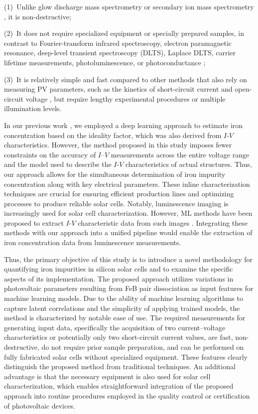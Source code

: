 \documentclass[a4paper,fleqn]{cas-sc}
\begin{document}
\noindent
(1)~Unlike glow discharge mass spectrometry or secondary ion mass spectrometry \cite{DiSabatino2014}, it is non-destructive;

\noindent
(2)~It does not require specialized equipment or specially prepared samples, in contrast
to Fourier-transform infrared spectroscopy, electron paramagnetic resonance, deep-level transient spectroscopy (DLTS),
Laplace DLTS, carrier lifetime measurements, photoluminescence, or photoconductance
\cite{Schroder2006, HowMuchPhysics, LaplDLTS, Rein2, Schmidt2005, FeMethod2012, Goodarzi2017};

\noindent
(3)~It is relatively simple and fast compared to other methods that also rely on measuring PV parameters,
such as the kinetics of short-circuit current \cite{Olikh2021JAP} and open-circuit voltage \cite{Herguth2022},
but require lengthy experimental procedures or multiple illumination levels.

In our previous work \cite{Olikh2022PPV},
we employed a deep learning approach to estimate iron concentration based on the ideality factor,
which was also derived from $I$-$V$ characteristics.
However, the method proposed in this study imposes fewer constraints on the accuracy of $I$–$V$ measurements across the entire voltage range
and the model used to describe the $I$-$V$ characteristics of actual structures.
Thus, our approach allows for the simultaneous determination of iron impurity concentration along with key electrical parameters.
These inline characterization techniques are crucial for ensuring efficient production lines and optimizing processes to produce reliable solar cells.
Notably, luminescence imaging is increasingly used for solar cell characterization.
However, ML methods have been proposed to extract $I$-$V$ characteristic data from such images \cite{Kunze2023, Battaglia2023}.
Integrating these methods with our approach into a unified pipeline would enable the extraction of iron concentration data from luminescence measurements.

Thus, the primary objective of this study is to introduce a novel methodology for quantifying iron impurities
in silicon solar cells and to examine the specific aspects of its implementation.
The proposed approach utilizes variations in photovoltaic parameters resulting
from FeB pair dissociation as input features for machine learning models.
Due to the ability of machine learning algorithms to capture latent correlations and the simplicity of applying trained models,
the method is characterized by notable ease of use.
The required measurements for generating input data,
specifically the acquisition of two current–voltage characteristics or potentially
only two short-circuit current values, are fast, non-destructive, do not require prior sample preparation,
and can be performed on fully fabricated solar cells without specialized equipment.
These features clearly distinguish the proposed method from traditional techniques.
An additional advantage is that the necessary equipment is also used for solar cell characterization,
which enables straightforward integration of the proposed approach into routine procedures
employed in the quality control or certification of photovoltaic devices.
\end{document}
